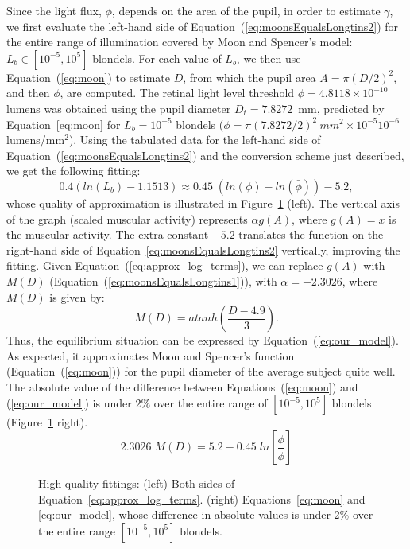 \documentclass{acmtog} %
\begin{document}
Since the light flux, $\phi$, depends on the area of the pupil, in order
to estimate $\gamma$, we first evaluate the left-hand side of
Equation~(\ref{eq:moonsEqualsLongtins2}) for the entire range of
illumination covered by Moon and Spencer's model: $L_b \in [10^{-5},
10^{5}]$ blondels. For each value of $L_b$, we then use
Equation~(\ref{eq:moon}) to estimate $D$, from which the pupil area $A =
\pi(D/2)^2$, and then $\phi$, are computed. The retinal light level
threshold $\bar{\phi} = 4.8118\times10^{-10}$ lumens was obtained using
the pupil diameter $D_t=7.8272$~mm, predicted by Equation~\ref{eq:moon}
for $L_b = 10^{-5}$ blondels ($\bar{\phi} = \pi(7.8272 / 2)^2~mm^2
\times 10^{-5} 10^{-6}$ lumens/mm$^2$). Using the tabulated data for the
left-hand side of Equation~(\ref{eq:moonsEqualsLongtins2}) and the
conversion scheme just described, we get the following fitting:
\begin{equation}
  0.4 ( {{ln}}(L_{b}) -1.1513)      \approx  0.45 \; ({{ln}}(\phi) - {{ln}}(\bar{\phi})) -5.2,
 \label{eq:approx_log_terms}
\end{equation}
whose quality of approximation is illustrated in
Figure~\ref{fig:Longtin_v_Moon_right_and_comparison} (left). The
vertical axis of the graph (scaled muscular activity) represents $\alpha
g(A)$, where $g(A) = x$ is the muscular activity. The extra constant
$-5.2$ translates the function on the right-hand side of
Equation~\ref{eq:moonsEqualsLongtins2} vertically, improving the
fitting. Given Equation~(\ref{eq:approx_log_terms}), we can replace
$g(A)$ with $M(D)$ (Equation~(\ref{eq:moonsEqualsLongtins1})), with
$\alpha = -2.3026$, where $M(D)$ is given by:
\begin{equation}
  M(D) = {{atanh}} \left( \frac{D-4.9}{3} \right).
  \label{eq:our_function_for_elasto_mechanical_prop}
\end{equation}
Thus, the equilibrium situation can be expressed by
Equation~(\ref{eq:our_model}). As expected, it approximates Moon and
Spencer's function (Equation~(\ref{eq:moon})) for the pupil diameter of
the average subject quite well. The absolute value of the difference
between Equations~(\ref{eq:moon}) and (\ref{eq:our_model}) is under
$2\%$ over the entire range of $[10^{-5}, 10^{5}]$ blondels
(Figure~\ref{fig:Longtin_v_Moon_right_and_comparison} right).
\begin{equation}
\label{eq:our_model}
  2.3026 \; M(D)  =  5.2 - 0.45 \; {{ln}} \left[\frac{\phi}{\bar{\phi}} \right]
\end{equation}
%
\begin{figure}[t]
\caption{High-quality fittings: (left) Both sides of
Equation~\ref{eq:approx_log_terms}. (right) Equations~\ref{eq:moon} and
\ref{eq:our_model}, whose difference in absolute values is under $2\%$
over the entire range $[10^{-5}, 10^{5}]$ blondels.}
    \label{fig:Longtin_v_Moon_right_and_comparison}
\end{figure}
%
\end{document}
